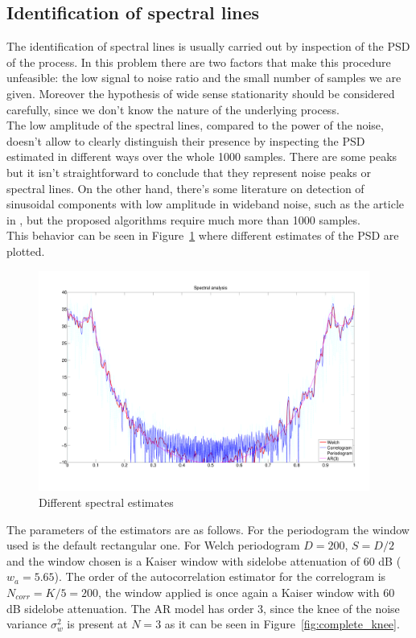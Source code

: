 \documentclass[10pt]{article}
\numberwithin{equation}{section}
\begin{document}
\subsection{Identification of spectral lines}
The identification of spectral lines is usually carried out by inspection of the PSD of the process. In this problem there are two factors that make this procedure unfeasible: the low signal to noise ratio and the small number of samples we are given. Moreover the hypothesis of wide sense stationarity should be considered carefully, since we don't know the nature of the underlying process. \\
The low amplitude of the spectral lines, compared to the power of the noise, doesn't allow to clearly distinguish their presence by inspecting the PSD estimated in different ways over the whole 1000 samples. There are some peaks but it isn't straightforward to conclude that they represent noise peaks or spectral lines. On the other hand, there's some literature on detection of sinusoidal components with low amplitude in wideband noise, such as the article in \cite{lowamp}, but the proposed algorithms require much more than 1000 samples.\\
This behavior can be seen in Figure~\ref{fig:complete_psd} where different estimates of the PSD are plotted.
\begin{figure}[htp]
  \centering
  \includegraphics[width=0.97\textwidth]{images/psd}
  \caption{Different spectral estimates}
  \label{fig:complete_psd}
\end{figure}
The parameters of the estimators are as follows. For the periodogram the window used is the default rectangular one. For Welch periodogram $D = 200$, $S = D/2$ and the window chosen is a Kaiser window with sidelobe attenuation of 60 dB ($w_a = 5.65$). The order of the autocorrelation estimator for the correlogram is $N_{corr} = K/5 = 200$, the window applied is once again a Kaiser window with 60 dB sidelobe attenuation. The AR model has order 3, since the knee of the noise variance $\sigma_w^2$ is present at $N=3$ as it can be seen in Figure~\ref{fig:complete_knee}.
\end{document}

